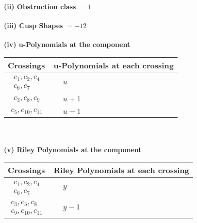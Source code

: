 \documentclass[1p]{elsarticle_modified}
\theoremstyle{definition}
\begin{document}
\flushleft \textbf{(ii) Obstruction class $= 1$}\\~\\
\flushleft \textbf{(iii) Cusp Shapes $= -12$}\\~\\
\newpage\renewcommand{\arraystretch}{1}
\flushleft \textbf{(iv) u-Polynomials at the component}\newline \\
\begin{tabular}{m{50pt}|m{274pt}}
Crossings & \hspace{64pt}u-Polynomials at each crossing \\
\hline $$\begin{aligned}c_{1},c_{2},c_{4}\\c_{6},c_{7}\end{aligned}$$&$\begin{aligned}
&u
\end{aligned}$\\
\hline $$\begin{aligned}c_{3},c_{8},c_{9}\end{aligned}$$&$\begin{aligned}
&u+1
\end{aligned}$\\
\hline $$\begin{aligned}c_{5},c_{10},c_{11}\end{aligned}$$&$\begin{aligned}
&u-1
\end{aligned}$\\
\hline
\end{tabular}\\~\\
\newpage\renewcommand{\arraystretch}{1}
\flushleft \textbf{(v) Riley Polynomials at the component}\newline \\
\begin{tabular}{m{50pt}|m{274pt}}
Crossings & \hspace{64pt}Riley Polynomials at each crossing \\
\hline $$\begin{aligned}c_{1},c_{2},c_{4}\\c_{6},c_{7}\end{aligned}$$&$\begin{aligned}
&y
\end{aligned}$\\
\hline $$\begin{aligned}c_{3},c_{5},c_{8}\\c_{9},c_{10},c_{11}\end{aligned}$$&$\begin{aligned}
&y-1
\end{aligned}$\\
\hline
\end{tabular}\\~\\
\end{document}

